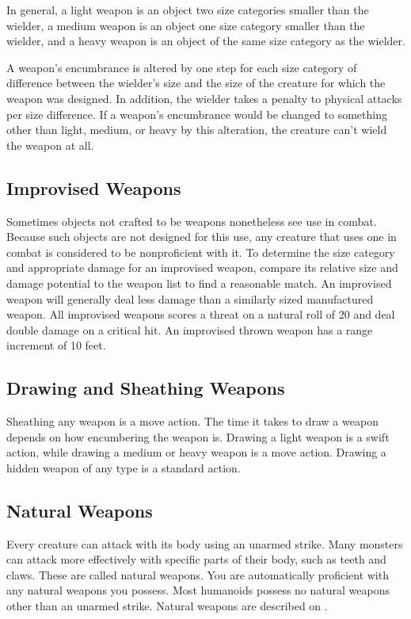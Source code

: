  In general, a light weapon is an object two size categories smaller than the wielder, a medium weapon is an object one size category smaller than the wielder, and a heavy weapon is an object of the same size category as the wielder.

 A weapon's encumbrance is altered by one step for each size category of difference between the wielder's size and the size of the creature for which the weapon was designed. In addition, the wielder takes a  penalty to physical attacks per size difference. If a weapon's encumbrance would be changed to something other than light, medium, or heavy by this alteration, the creature can't wield the weapon at all.

\subsection{Improvised Weapons} Sometimes objects not crafted to be weapons nonetheless see use in combat. Because such objects are not designed for this use, any creature that uses one in combat is considered to be nonproficient with it. To determine the size category and appropriate damage for an improvised weapon, compare its relative size and damage potential to the weapon list to find a reasonable match. An improvised weapon will generally deal less damage than a similarly sized manufactured weapon. All improvised weapons scores a threat on a natural roll of 20 and deal double damage on a critical hit. An improvised thrown weapon has a range increment of 10 feet.

\subsection{Drawing and Sheathing Weapons}\label{Drawing and Sheathing Weapons}
Sheathing any weapon is a move action. The time it takes to draw a weapon depends on how encumbering the weapon is. Drawing a light weapon is a swift action, while drawing a medium or heavy weapon is a move action. Drawing a hidden weapon of any type is a standard action. 

\subsection{Natural Weapons}\label{Natural Weapons}
Every creature can attack with its body using an unarmed strike. Many monsters can attack more effectively with specific parts of their body, such as teeth and claws. These are called natural weapons. You are automatically proficient with any natural weapons you possess. Most humanoids possess no natural weapons other than an unarmed strike. Natural weapons are described on .

